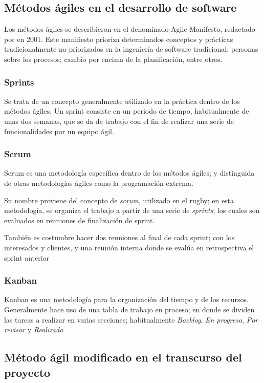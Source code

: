 \documentclass[12pt,a4paper,twoside,openright]{book}
\begin{document}
\subsection{Métodos ágiles en el desarrollo de software}

Los métodos ágiles se describieron en el denominado Agile Manifesto, redactado por en 2001. Este manifiesto prioriza determinados conceptos y prácticas tradicionalmente no priorizados en la ingeniería de software tradicional; personas sobre los procesos; cambio por encima de la planificación, entre otros. 

\subsubsection{Sprints}

Se trata de un concepto generalmente utilizado en la práctica dentro de los métodos ágiles. Un sprint consiste en un periodo de tiempo, habitualmente de unas dos semanas, que se da de trabajo con el fin de realizar una serie de funcionalidades por un equipo ágil.

\subsubsection{Scrum}

Scrum es una metodología específica dentro de los métodos ágiles; y distinguida de otras metodologías ágiles como la programación extrema.

Su nombre proviene del concepto de \textit{scrum}, utilizado en el rugby; en esta metodología, se organiza el trabajo a partir de una serie de \textit{sprints}; los cuales son evaluados en reuniones de finalización de sprint.

También es costumbre hacer dos reuniones al final de cada sprint; con los interesados y clientes, y una reunión interna donde se evalúa en retrospectiva el sprint anterior

\subsubsection{Kanban}

Kanban es una metodología para la organización del tiempo y de los recursos. Generalmente hace uso de una tabla de trabajo en proceso; en donde se dividen las tareas a realizar en varias secciones; habitualmente \textit{Backlog}, \textit{En progreso}, \textit{Por revisar} y \textit{Realizada} 

\subsection{Método ágil modificado en el transcurso del proyecto}
\end{document}
